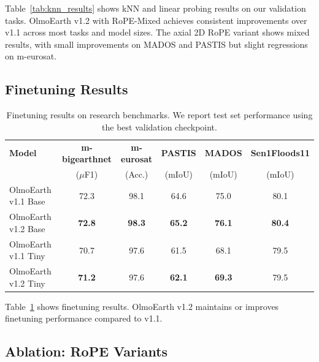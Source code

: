 \documentclass{article}
\begin{document}
Table~\ref{tab:knn_results} shows kNN and linear probing results on our validation tasks. OlmoEarth v1.2 with RoPE-Mixed achieves consistent improvements over v1.1 across most tasks and model sizes. The axial 2D RoPE variant shows mixed results, with small improvements on MADOS and PASTIS but slight regressions on m-eurosat.

\subsection{Finetuning Results}

\begin{table}[h!]
\centering
\caption{Finetuning results on research benchmarks. We report test set performance using the best validation checkpoint.}
\label{tab:finetune_results}
\small
\begin{tabular}{l|ccccc}
\toprule
\textbf{Model} & \textbf{m-bigearthnet} & \textbf{m-eurosat} & \textbf{PASTIS} & \textbf{MADOS} & \textbf{Sen1Floods11} \\
& ($\mu$F1) & (Acc.) & (mIoU) & (mIoU) & (mIoU) \\
\midrule
OlmoEarth v1.1 Base & 72.3 & 98.1 & 64.6 & 75.0 & 80.1 \\
OlmoEarth v1.2 Base & \textbf{72.8} & \textbf{98.3} & \textbf{65.2} & \textbf{76.1} & \textbf{80.4} \\
\midrule
OlmoEarth v1.1 Tiny & 70.7 & 97.6 & 61.5 & 68.1 & 79.5 \\
OlmoEarth v1.2 Tiny & \textbf{71.2} & 97.6 & \textbf{62.1} & \textbf{69.3} & 79.5 \\
\bottomrule
\end{tabular}
\end{table}

Table~\ref{tab:finetune_results} shows finetuning results. OlmoEarth v1.2 maintains or improves finetuning performance compared to v1.1.

\subsection{Ablation: RoPE Variants}
\end{document}
